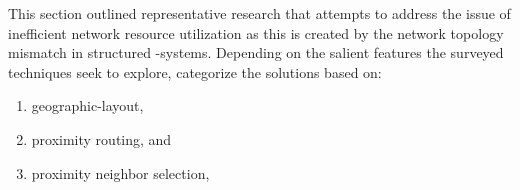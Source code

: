 
This section outlined
representative research that attempts 
to address the issue of inefficient network resource utilization 
as this is created by the network topology mismatch
in structured \p-systems.
Depending on the salient features the surveyed techniques seek to explore,
\cite{CDHR2002,CDCR2002,RSS2002} categorize the solutions based on:
\begin{enumerate}
  \item geographic-layout,
  \item proximity routing, and 
  \item proximity neighbor selection,
\end{enumerate}

